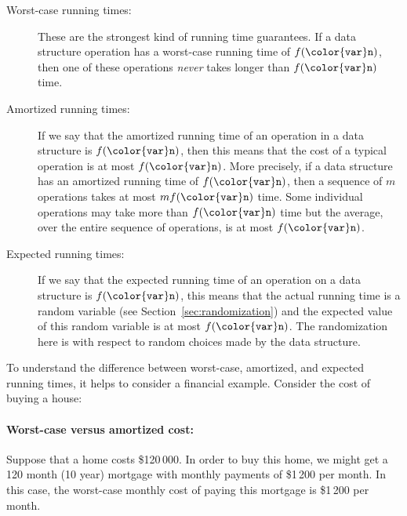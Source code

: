\documentclass[10pt]{book}
\newcommand{\secref}[1]{Section~\ref{sec:#1}}
\theoremstyle{plain}
\theoremstyle{definition}
\begin{document}
\begin{description}
\item[Worst-case running times:] 
  These are the strongest kind of running
  time guarantees.  If a data structure operation has a worst-case
  running time of $f(\ensuremath{\mathtt{{\color{var}n}}})$, then one of these operations \emph{never}
  takes longer than $f(\ensuremath{\mathtt{{\color{var}n}}})$ time.
\item[Amortized running times:]
  If we say that the amortized running
  time of an operation in a data structure is $f(\ensuremath{\mathtt{{\color{var}n}}})$, then this means that
  the cost of a typical operation is at most $f(\ensuremath{\mathtt{{\color{var}n}}})$.  More precisely,
  if a data structure has an amortized running time of $f(\ensuremath{\mathtt{{\color{var}n}}})$,
  then a sequence of $m$ operations takes at most $mf(\ensuremath{\mathtt{{\color{var}n}}})$ time.
  Some individual operations may take more than $f(\ensuremath{\mathtt{{\color{var}n}}})$ time but the
  average, over the entire sequence of operations, is at most $f(\ensuremath{\mathtt{{\color{var}n}}})$.
\item[Expected running times:] 
  If we say that the expected running time
  of an operation on a data structure is $f(\ensuremath{\mathtt{{\color{var}n}}})$, this means that the
  actual running time is a random variable (see \secref{randomization})
  and the expected value of this random variable is at most $f(\ensuremath{\mathtt{{\color{var}n}}})$.
  The randomization here is with respect to random choices made by the
  data structure.
\end{description}

To understand the difference between worst-case, amortized, and expected
running times, it helps to consider a financial example.  Consider the
cost of buying a house:
\paragraph{Worst-case versus amortized cost:}
%
Suppose that a home costs \$120\,000.  In order to buy this home,
we might get a 120 month (10 year) mortgage with monthly payments of
\$1\,200 per month.  In this case, the worst-case monthly cost of paying
this mortgage is \$1\,200 per month.
\end{document}
